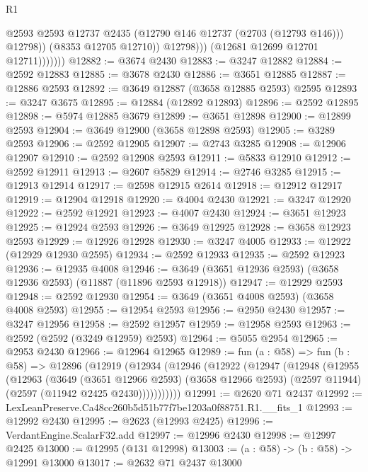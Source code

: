 \begin{lexlean}{R1}
\begin{coremodule}
                            @2593
                            @2593
                            @12737
                            @2435
                            (@12790 @146 @12737 (@2703 (@12793 @146)))
                            @12798))
                        (@8353 @12705 @12710))
                      @12798)))
                (@12681 @12699 @12701 @12711)))))))
@12882 := @3674 @2430
@12883 := @3247 @12882
@12884 := @2592 @12883
@12885 := @3678 @2430
@12886 := @3651 @12885
@12887 := @12886 @2593
@12892 := @3649 @12887 (@3658 @12885 @2593) @2595
@12893 := @3247 @3675
@12895 := @12884 (@12892 @12893)
@12896 := @2592 @12895
@12898 := @5974 @12885 @3679
@12899 := @3651 @12898
@12900 := @12899 @2593
@12904 := @3649 @12900 (@3658 @12898 @2593)
@12905 := @3289 @2593
@12906 := @2592 @12905
@12907 := @2743 @3285
@12908 := @12906 @12907
@12910 := @2592 @12908 @2593
@12911 := @5833 @12910
@12912 := @2592 @12911
@12913 := @2607 @5829
@12914 := @2746 @3285
@12915 := @12913 @12914
@12917 := @2598 @12915 @2614
@12918 := @12912 @12917
@12919 := @12904 @12918
@12920 := @4004 @2430
@12921 := @3247 @12920
@12922 := @2592 @12921
@12923 := @4007 @2430
@12924 := @3651 @12923
@12925 := @12924 @2593
@12926 := @3649 @12925
@12928 := @3658 @12923 @2593
@12929 := @12926 @12928
@12930 := @3247 @4005
@12933 := @12922 (@12929 @12930 @2595)
@12934 := @2592 @12933
@12935 := @2592 @12923
@12936 := @12935 @4008
@12946 := @3649 (@3651 @12936 @2593) (@3658 @12936 @2593) (@11887 (@11896 @2593 @12918))
@12947 := @12929 @2593
@12948 := @2592 @12930
@12954 := @3649 (@3651 @4008 @2593) (@3658 @4008 @2593)
@12955 := @12954 @2593
@12956 := @2950 @2430
@12957 := @3247 @12956
@12958 := @2592 @12957
@12959 := @12958 @2593
@12963 := @2592 (@2592 (@3249 @12959) @2593)
@12964 := @5055 @2954
@12965 := @2953 @2430
@12966 := @12964 @12965
@12989 := fun (a : @58) =>
  fun (b : @58) =>
  @12896
    (@12919
      (@12934
        (@12946
          (@12922
            (@12947
              (@12948
                (@12955
                  (@12963
                    (@3649
                      (@3651 @12966 @2593)
                      (@3658 @12966 @2593)
                      (@2597 @11944)
                      (@2597 (@11942 @2425 @2430)))))))))))
@12991 := @2620 @71 @2437
@12992 := LexLeanPreserve.Ca48cc260b5d51b77f7be1203a0f88751.R1.__fits_1
@12993 := @12992 @2430
@12995 := @2623 (@12993 @2425)
@12996 := VerdantEngine.ScalarF32.add
@12997 := @12996 @2430
@12998 := @12997 @2425
@13000 := @12995 (@131 @12998)
@13003 := (a : @58) -> (b : @58) -> @12991 @13000
@13017 := @2632
    @71
    @2437
    @13000

\end{coremodule}
\end{lexlean}
